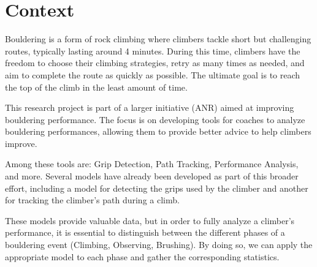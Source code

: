 \section{Context}
\label{section:context}

Bouldering is a form of rock climbing where climbers tackle short but challenging routes, typically lasting around 4 minutes. During this time, climbers have the freedom to choose their climbing strategies, retry as many times as needed, and aim to complete the route as quickly as possible. The ultimate goal is to reach the top of the climb in the least amount of time.

This research project is part of a larger initiative (ANR) aimed at improving bouldering performance. The focus is on developing tools for coaches to analyze bouldering performances, allowing them to provide better advice to help climbers improve.

Among these tools are: Grip Detection, Path Tracking, Performance Analysis, and more. Several models have already been developed as part of this broader effort, including a model for detecting the grips used by the climber and another for tracking the climber's path during a climb.

These models provide valuable data, but in order to fully analyze a climber's performance, it is essential to distinguish between the different phases of a bouldering event (Climbing, Observing, Brushing). By doing so, we can apply the appropriate model to each phase and gather the corresponding statistics.

